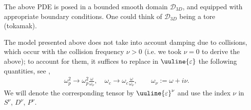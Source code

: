 \documentclass[report]{elsarticle}
\numberwithin{theorem}{section}
\begin{document}
The above PDE is posed in a bounded smooth domain $\mathcal{D}_{3D}$, and equipped with appropriate boundary conditions. One could think of $\mathcal{D}_{3D}$ being a tore (tokamak). 


The model presented above does not take into account damping due to collisions, which occur with the collision frequency $\nu>0$ (i.e. we took $\nu=0$ to derive the above); to account for them, it suffices to replace in $\uuline{\varepsilon}$ the following quantities, see \cite[p.38]{stix1992waves},
\begin{align*}
	\omega_p^2\rightarrow \omega_p^2 \frac{\omega}{\omega_{\nu}}, \quad 	\omega_c\rightarrow \omega_c \frac{\omega}{\omega_{\nu}}, \qquad  \omega_{\nu}:=\omega+i\nu.
\end{align*}
We will denote the corresponding tensor by $\uuline{\varepsilon}^{\nu}$ and use the index $\nu$ in $S^{\nu}$, $D^{\nu}$, $P^{\nu}$. 
\end{document}
